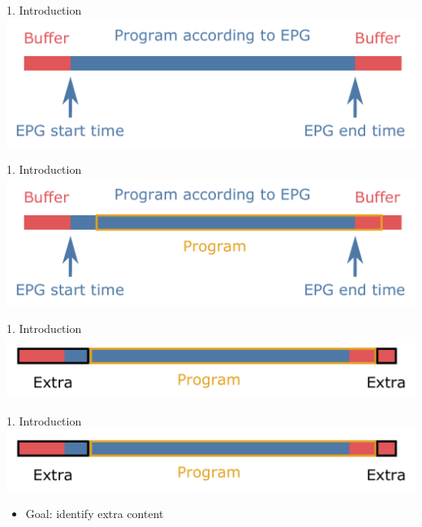 \documentclass[first=orange,second=blue,logo=blueque]{aaltoslides}
\begin{document}

\begin{frame}{1. Introduction}
    \includegraphics[width=1\textwidth]{figures/recording0.pdf}
\end{frame}
    

\begin{frame}{1. Introduction}
    \includegraphics[width=1\textwidth]{figures/recording1.pdf}
\end{frame}
        

\begin{frame}{1. Introduction}
    \includegraphics[width=1\textwidth]{figures/recording2.pdf}
\end{frame}
    

\begin{frame}{1. Introduction}
    \includegraphics[width=1\textwidth]{figures/recording2.pdf}
    \begin{itemize}
        \item Goal: identify extra content
    \end{itemize}
\end{frame}
    
\end{document}
